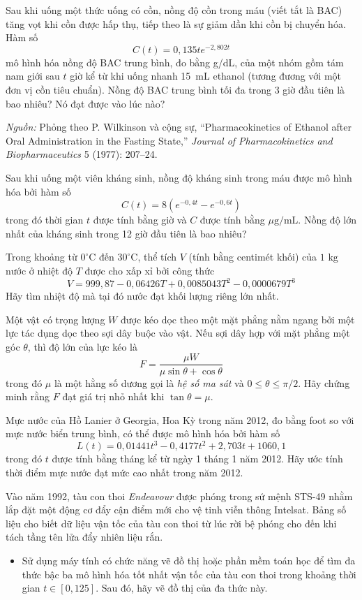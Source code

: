 \noindent
\begin{minipage}[t]{0.482\textwidth}
 Sau khi uống một thức uống có cồn, nồng độ cồn trong máu (viết tắt là BAC) tăng vọt khi cồn được hấp thụ, tiếp theo là sự giảm dần khi cồn bị chuyển hóa. Hàm số
\[
C(t) = 0{,}135t e^{-2{,}802t}
\]
mô hình hóa nồng độ BAC trung bình, đo bằng g/dL, của một nhóm gồm tám nam giới sau $t$ giờ kể từ khi uống nhanh 15~mL ethanol (tương đương với một đơn vị cồn tiêu chuẩn). Nồng độ BAC trung bình tối đa trong 3 giờ đầu tiên là bao nhiêu? Nó đạt được vào lúc nào?

\vspace{2pt}
{\scriptsize\textit{Nguồn:} Phỏng theo P. Wilkinson và cộng sự, “Pharmacokinetics of Ethanol after Oral Administration in the Fasting State,” \textit{Journal of Pharmacokinetics and Biopharmaceutics} 5 (1977): 207–24.}

 Sau khi uống một viên kháng sinh, nồng độ kháng sinh trong máu được mô hình hóa bởi hàm số
\[
C(t) = 8\left(e^{-0{,}4t} - e^{-0{,}6t}\right)
\]
trong đó thời gian $t$ được tính bằng giờ và $C$ được tính bằng $\mu\text{g/mL}$. Nồng độ lớn nhất của kháng sinh trong 12 giờ đầu tiên là bao nhiêu?

 Trong khoảng từ $0^\circ\text{C}$ đến $30^\circ\text{C}$, thể tích $V$ (tính bằng centimét khối) của $1\text{ kg}$ nước ở nhiệt độ $T$ được cho xấp xỉ bởi công thức
\[
V = 999{,}87 - 0{,}06426T + 0{,}0085043T^2 - 0{,}0000679T^3
\]
Hãy tìm nhiệt độ mà tại đó nước đạt khối lượng riêng lớn nhất.

 Một vật có trọng lượng $W$ được kéo dọc theo một mặt phẳng nằm ngang bởi một lực tác dụng dọc theo sợi dây buộc vào vật. Nếu sợi dây hợp với mặt phẳng một góc $\theta$, thì độ lớn của lực kéo là
\[
F = \frac{\mu W}{\mu \sin\theta + \cos\theta}
\]
trong đó $\mu$ là một hằng số dương gọi là \textit{hệ số ma sát} và $0 \leqslant \theta \leqslant \pi/2$. Hãy chứng minh rằng $F$ đạt giá trị nhỏ nhất khi $\tan\theta = \mu$.

 Mực nước của Hồ Lanier ở Georgia, Hoa Kỳ trong năm 2012, đo bằng foot so với mực nước biển trung bình, có thể được mô hình hóa bởi hàm số
\[
L(t) = 0{,}01441t^3 - 0{,}4177t^2 + 2{,}703t + 1060{,}1
\]
trong đó $t$ được tính bằng tháng kể từ ngày 1 tháng 1 năm 2012. Hãy ước tính thời điểm mực nước đạt mức cao nhất trong năm 2012.

 Vào năm 1992, tàu con thoi \textit{Endeavour} được phóng trong sứ mệnh STS-49 nhằm lắp đặt một động cơ đẩy cận điểm mới cho vệ tinh viễn thông Intelsat. Bảng số liệu cho biết dữ liệu vận tốc của tàu con thoi từ lúc rời bệ phóng cho đến khi tách tầng tên lửa đẩy nhiên liệu rắn.
\begin{itemize}
  \setlength{\itemsep}{0pt}%
  \setlength{\topsep}{2pt}%
  \setlength{\leftmargin}{1.5em}%
  \item[(a)] Sử dụng máy tính có chức năng vẽ đồ thị hoặc phần mềm toán học để tìm đa thức bậc ba mô hình hóa tốt nhất vận tốc của tàu con thoi trong khoảng thời gian $t \in [0, 125]$. Sau đó, hãy vẽ đồ thị của đa thức này.
\end{itemize}
\end{minipage}%
